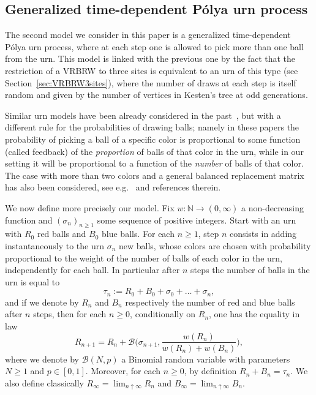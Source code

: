 \documentclass[10pt,a4paper]{amsart}
\newcommand{\1}{{\text{\Large $\mathfrak 1$}}}
\begin{document}
\subsection{Generalized time-dependent P\'olya urn process} 
The second model we consider in this paper is a generalized time-dependent P\'olya urn process, where at each step one is allowed to pick more than one ball from the urn. This model is linked with the previous one by 
the fact that the restriction of a VRBRW to three sites is equivalent to an urn of this type (see Section~\ref{sec:VRBRW3sites}), where the number of draws at each step is itself random and given by the number of vertices in Kesten's tree at odd generations. 

\vspace{0,2cm}
Similar urn models have been already considered in the past~\cite{RT24,Si18a,Si18b}, but with a different rule for the probabilities of drawing balls; namely in these papers the probability of picking a ball of a specific color is proportional to some function (called feedback) of the {\em proportion} of balls of that color in the urn, while in our setting it will be proportional to a function of the {\em number} of balls of that color. The case with more than two colors and a general balanced replacement matrix has also been considered, see e.g.~\cite{KS,KM17,KMP,LMS,MS25} and references therein.  

\vspace{0,2cm}
We now define more precisely our model. Fix $w:\mathbb N \to (0,\infty)$ a non-decreasing function and $(\sigma_n)_{n\ge 1}$ some sequence of positive integers. 
Start with an urn with $R_0$ red balls and $B_0$ blue balls.  
For each $n\ge 1$, step $n$ consists in adding instantaneously to the urn $\sigma_n$ new balls, whose colors are chosen with probability proportional to the weight of the number of balls of each color 
in the urn, independently for each ball.  
In particular after $n$ steps the number of balls in the urn is equal to
$$\tau_n := R_0 + B_0 + \sigma_0+\dots + \sigma_n,$$ 
and if we denote by $R_n$ and $B_n$ respectively the number of red and blue balls after $n$ steps, then for each $n\ge 0$, conditionally on $R_n$, one has the equality in law
$$R_{n+1} = R_n + \mathcal B\Big( \sigma_{n+1}, \frac{w(R_n)}{w(R_n) + w(B_n)}\Big),$$
where we denote by $\mathcal B(N,p)$ a Binomial random variable with parameters $N\ge 1$ and $p\in [0,1]$. Moreover, for each $n\ge 0$, by definition $R_n + B_n = \tau_n$. 
We also define classically $R_\infty =\lim_{n\uparrow \infty} R_n$ and $B_\infty = \lim_{n\uparrow \infty} B_n$. 
\end{document}
